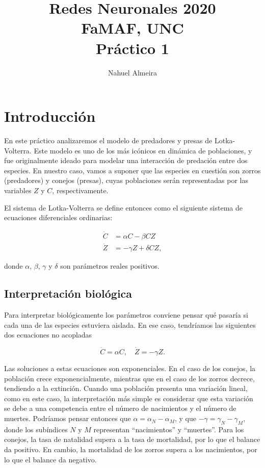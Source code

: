 \documentclass[10pt,twocolumn]{article}
\begin{document}
\author{Nahuel Almeira}

\title{Redes Neuronales 2020\\ FaMAF, UNC\\ Práctico 1}

\maketitle

\section{Introducción}


En este práctico analizaremos el modelo de predadores y presas de Lotka-Volterra. Este modelo es uno de los más icónicos en dinámica de poblaciones, y fue originalmente ideado para modelar una interacción de predación entre dos especies. En nuestro caso, vamos a suponer que las especies en cuestión son zorros (predadores) y conejos (presas), cuyas poblaciones serán representadas por las variables $Z$ y $C$, respectivamente. 

El sistema de Lotka-Volterra se define entonces como el siguiente sistema de ecuaciones diferenciales ordinarias:

\begin{align}
\dot{C} &= \alpha C - \beta C Z \label{eq:LV-C} \\
\dot{Z} &= -\gamma Z + \delta C Z \label{eq:LV-Z},
\end{align}


donde $\alpha$, $\beta$, $\gamma$ y $\delta$ son parámetros reales positivos.

\subsection{Interpretación biológica}

Para interpretar biológicamente los parámetros conviene pensar qué pasaría si cada una de las especies estuviera aislada. En ese caso, tendríamos las siguientes dos ecuaciones no acopladas

\begin{equation}
\dot{C} = \alpha C, \quad \dot{Z} = - \gamma Z.
\end{equation}

Las soluciones a estas ecuaciones son exponenciales. En el caso de los conejos, la población crece exponencialmente, mientras que en el caso de los zorros decrece, tendiendo a la extinción. Cuando una población presenta una variación lineal, como en este caso, la interpretación más simple es considerar que esta variación se debe a una competencia entre el número de nacimientos y el número de muertes. Podríamos pensar entonces que $\alpha = \alpha_N - \alpha_M$, y que $-\gamma = \gamma_N - \gamma_M$, donde los subíndices $N$ y $M$ representan ``nacimientos'' y ``muertes''. Para los conejos, la tasa de natalidad supera a la tasa de mortalidad, por lo que el balance da positivo. En cambio, la mortalidad de los zorros supera a los nacimientos, por lo que el balance da negativo. 
\end{document}
